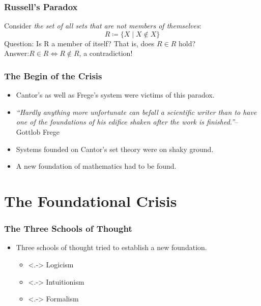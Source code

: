 \documentclass{beamer}
\begin{document}
\begin{frame}
    \frametitle{Russell's Paradox}
	Consider \textit{the set of all sets that are not members of themselves}:
	\begin{equation*}
		R\coloneqq\{X\mid X\notin X\}
	\end{equation*}\pause
	Question: Is R a member of itself? That is, does $R\in R$ hold?\pause\\
	\vspace{\baselineskip}
	Answer:\hspace{4.3em}$R\in R \iff R\notin R$, a contradiction!
\end{frame}
\begin{frame}
    \frametitle{The Begin of the Crisis}
    \begin{itemize}[<+->]
	\item Cantor's as well as Frege's system were victims of this paradox.
	\item \textit{``Hardly anything more unfortunate can befall a scientific writer than to have one of the foundations of his edifice shaken after the work is finished.''\nocite{frege_appendix}}\hfill-- Gottlob Frege
	\item Systems founded on Cantor's set theory were on shaky ground.
	\item A new foundation of mathematics had to be found.
    \end{itemize}
\end{frame}
\section{The Foundational Crisis}
\begin{frame}
    \frametitle{The Three Schools of Thought}
    \begin{itemize}[<+->]
	\item Three schools of thought tried to establish a new foundation.
	\begin{itemize}
		\item<.-> Logicism
		\item<.-> Intuitionism
		\item<.-> Formalism
	\end{itemize}
    \end{itemize}
\end{frame}
\end{document}
